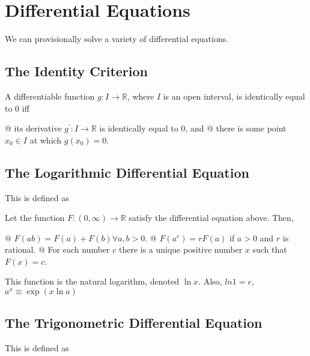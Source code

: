 \section{Differential Equations}  %
We can provisionally solve a variety of differential equations.

    \subsection{The Identity Criterion}
    A differentiable function $g:I\to\mathbb{R}$, where $I$ is an open interval, is identically equal to 0 iff

    \begin{easylist}[enumerate]
        @ its derivative $g^\prime:I\to\mathbb{R}$ is identically equal to 0, and
        @ there is some point $x_0 \in I$ at which $g(x_0) = 0$.
    \end{easylist}

    \subsection{The Logarithmic Differential Equation}
    This is defined as

    \begin{thm}
        Let the function $F:(0, \infty) \to \mathbb{R}$ satisfy the differential equation above. Then,

        \begin{easylist}[enumerate]
            @ $F(ab) = F(a) + F(b) \forall a, b > 0$.
            @ $F(a^r) = r F(a)$ if $a > 0$ and $r$ is rational.
            @ For each number $c$ there is a unique positive number $x$ such that $F(x) = c$.
        \end{easylist}
    \end{thm}

    This function is the natural logarithm, denoted $\ln x$. Also, $ln 1 = e$, $a^x \equiv \exp(x \ln a)$

    \subsection{The Trigonometric Differential Equation}
    This is defined as

